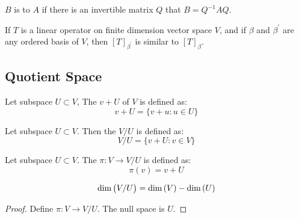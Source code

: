 	



\begin{definition}
	$B$ is  to $A$ if there is an invertible matrix $Q$ that $B = Q^{-1} A Q$.
\end{definition}

\begin{theorem}
If $T$ is a linear operator on finite dimension vector space $V$, and if $\beta$ and $\beta^\prime$ are any ordered basis of $V$, then $[T]_{\beta^\prime}$ is similar to $[T]_\beta$.    
\end{theorem}




\subsection{Quotient Space}

\begin{definition}
    Let subspace $U \subset V$, The   $v + U$ of $V$ is defined as:
    \begin{equation}
        v + U = \{ v + u: u \in U\}
    \end{equation}    
\end{definition}

\begin{definition}
    Let subspace $U \subset V$. Then the  $V/U$ is defined as:
    \begin{equation}
        V/U = \{ v + U: v \in V \}
    \end{equation}
\end{definition}

\begin{definition}
    Let subspace $U \subset V$. The  $\pi: V \rightarrow V/U$ is defined as:
    \begin{equation}
        \pi(v) = v + U
    \end{equation}
\end{definition}

\begin{theorem}
    \begin{equation}
        \displaystyle \text{dim}\left( V/U \right) = \displaystyle \text{dim}\left( V \right) - \displaystyle \text{dim}\left( U \right)
    \end{equation}
\end{theorem}

\begin{proof}
    Define $\pi : V \rightarrow V/U$. The null space is $U$.
\end{proof}

